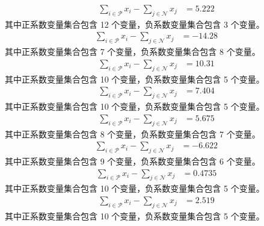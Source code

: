 \documentclass[a4paper,11pt]{article}
\begin{document}
\begin{align}
\sum_{i \in \mathcal{P}} x_i - \sum_{j \in \mathcal{N}} x_j &= 5.222 \nonumber
\end{align}
其中正系数变量集合包含 12 个变量，负系数变量集合包含 3 个变量。\\[0.3em]

\begin{align}
\sum_{i \in \mathcal{P}} x_i - \sum_{j \in \mathcal{N}} x_j &= -14.28 \nonumber
\end{align}
其中正系数变量集合包含 7 个变量，负系数变量集合包含 8 个变量。\\[0.3em]

\begin{align}
\sum_{i \in \mathcal{P}} x_i - \sum_{j \in \mathcal{N}} x_j &= 10.31 \nonumber
\end{align}
其中正系数变量集合包含 10 个变量，负系数变量集合包含 5 个变量。\\[0.3em]

\begin{align}
\sum_{i \in \mathcal{P}} x_i - \sum_{j \in \mathcal{N}} x_j &= 7.404 \nonumber
\end{align}
其中正系数变量集合包含 10 个变量，负系数变量集合包含 5 个变量。\\[0.3em]

\begin{align}
\sum_{i \in \mathcal{P}} x_i - \sum_{j \in \mathcal{N}} x_j &= 5.675 \nonumber
\end{align}
其中正系数变量集合包含 8 个变量，负系数变量集合包含 7 个变量。\\[0.3em]

\begin{align}
\sum_{i \in \mathcal{P}} x_i - \sum_{j \in \mathcal{N}} x_j &= -6.622 \nonumber
\end{align}
其中正系数变量集合包含 9 个变量，负系数变量集合包含 6 个变量。\\[0.3em]

\begin{align}
\sum_{i \in \mathcal{P}} x_i - \sum_{j \in \mathcal{N}} x_j &= 0.4735 \nonumber
\end{align}
其中正系数变量集合包含 10 个变量，负系数变量集合包含 5 个变量。\\[0.3em]

\begin{align}
\sum_{i \in \mathcal{P}} x_i - \sum_{j \in \mathcal{N}} x_j &= 2.519 \nonumber
\end{align}
其中正系数变量集合包含 10 个变量，负系数变量集合包含 5 个变量。\\[0.3em]
\end{document}
